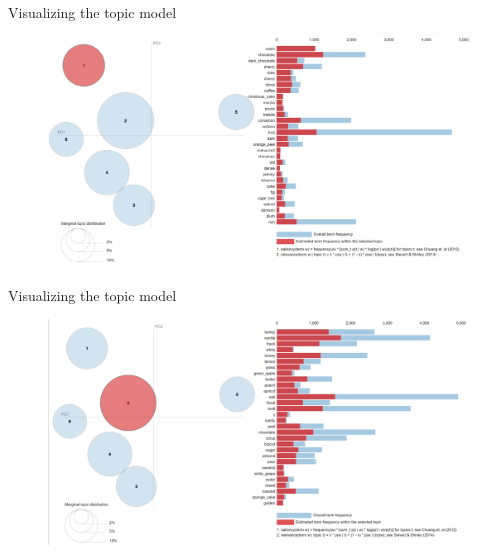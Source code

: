 \documentclass{beamer}
\begin{document}
	\begin{frame}{Visualizing the topic model}
	
	\begin{figure}[H]
		\begin{center}
			\includegraphics[scale = 0.37]{PyLDAvis_topmodel1}
		\end{center}
	\end{figure}
	
\end{frame}
\begin{frame}{Visualizing the topic model}
	
	\begin{figure}[H]
		\begin{center}
			\includegraphics[scale = 0.37]{PyLDAvis_topmodel2}
		\end{center}
	\end{figure}
\end{frame}
\end{document}
